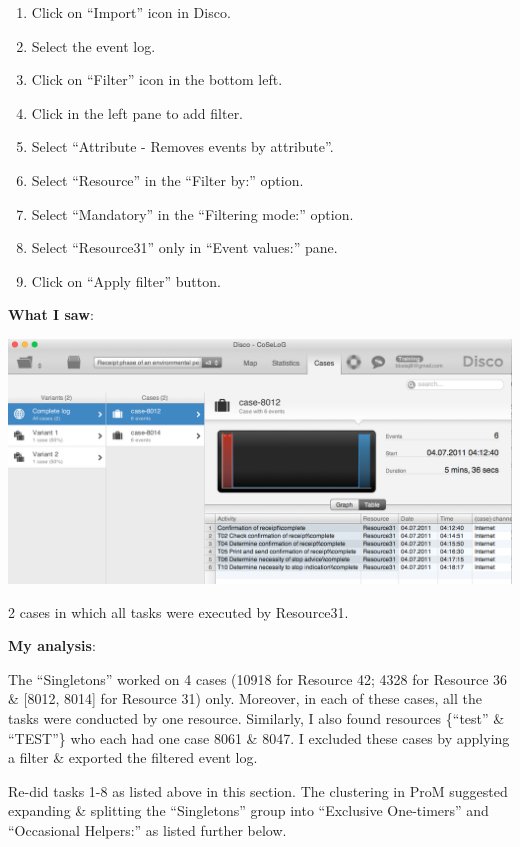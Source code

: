 \documentclass[]{article}
\begin{document}
\begin{enumerate}
\def\labelenumi{\arabic{enumi}.}
\setcounter{enumi}{10}
\itemsep1pt\parskip0pt
\item
  Click on ``Import'' icon in Disco.
\item
  Select the event log.
\item
  Click on ``Filter'' icon in the bottom left.
\item
  Click in the left pane to add filter.
\item
  Select ``Attribute - Removes events by attribute''.
\item
  Select ``Resource'' in the ``Filter by:'' option.
\item
  Select ``Mandatory'' in the ``Filtering mode:'' option.
\item
  Select ``Resource31'' only in ``Event values:'' pane.
\item
  Click on ``Apply filter'' button.
\end{enumerate}

\textbf{What I saw}:

\includegraphics{CoSeLog_Step07_Filter_Resource31.png}

2 cases in which all tasks were executed by Resource31.

\textbf{My analysis}:

The ``Singletons'' worked on 4 cases (10918 for Resource 42; 4328 for
Resource 36 \& {[}8012, 8014{]} for Resource 31) only. Moreover, in each
of these cases, all the tasks were conducted by one resource. Similarly,
I also found resources \{``test'' \& ``TEST''\} who each had one case
8061 \& 8047. I excluded these cases by applying a filter \& exported
the filtered event log.

Re-did tasks 1-8 as listed above in this section. The clustering in ProM
suggested expanding \& splitting the ``Singletons'' group into
``Exclusive One-timers'' and ``Occasional Helpers:'' as listed further
below.
\end{document}
